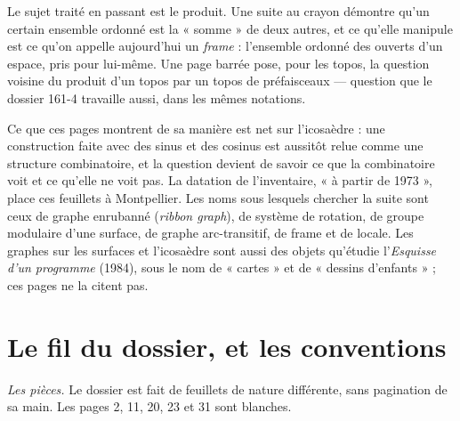 \documentclass[11pt,a4paper]{article}
\begin{document}
\begin{resume}
Le sujet traité en passant est le produit. Une suite au crayon démontre qu'un
certain ensemble ordonné est la « somme » de deux autres, et ce qu'elle
manipule est ce qu'on appelle aujourd'hui un \emph{frame} : l'ensemble
ordonné des ouverts d'un espace, pris pour lui-même. Une page barrée pose, pour
les topos, la question voisine du produit d'un topos par un topos de
préfaisceaux --- question que le dossier 161-4 travaille aussi, dans les mêmes
notations.

Ce que ces pages montrent de sa manière est net sur l'icosaèdre : une
construction faite avec des sinus et des cosinus est aussitôt relue comme une
structure combinatoire, et la question devient de savoir ce que la
combinatoire voit et ce qu'elle ne voit pas. La datation de l'inventaire,
« à partir de 1973 », place ces feuillets à Montpellier. Les noms sous
lesquels chercher la suite sont ceux de graphe enrubanné (\emph{ribbon
graph}), de système de rotation, de groupe modulaire d'une surface, de graphe
arc-transitif, de frame et de locale. Les graphes sur les surfaces et
l'icosaèdre sont aussi des objets qu'étudie l'\emph{Esquisse d'un programme}
(1984), sous le nom de « cartes » et de « dessins d'enfants » ; ces pages ne la
citent pas.

\end{resume}

\section*{Le fil du dossier, et les conventions}

\emph{Les pièces.} Le dossier est fait de feuillets de nature différente,
sans pagination de sa main. Les pages 2, 11, 20, 23 et 31 sont blanches.
\end{document}

